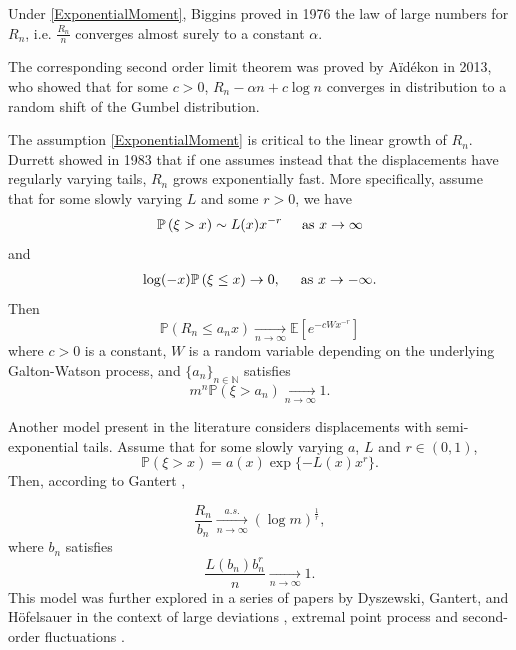 \documentclass[12pt]{article}
\numberwithin{equation}{section}
\newcommand{\E}{\mathbb{E}}
\newcommand{\N}{\mathbb{N}}
\begin{document}
Under \eqref{ExponentialMoment}, Biggins \cite{Biggins1976} proved in 1976 the law of large numbers for $R_n$,  i.e.  $\frac {R_n} n$ converges almost surely to a constant $\alpha$.

The corresponding second order limit theorem was proved by Aïdékon \cite{Aidekon2013} in 2013, who showed that for some $c>0$, $R_n - \alpha  n + c \log n $ converges in distribution to a random shift of the Gumbel distribution.

The assumption \eqref{ExponentialMoment} is critical to the linear growth of $R_n$. Durrett \cite{Durrett1983} showed in 1983 that if one assumes instead that the displacements have regularly varying tails, $R_n$ grows exponentially fast. More specifically, assume that for some slowly varying $L$ and some $r>0$, we have
\begin{align}\label{tailsdurrett}
    \mathbb{P}\left(\xi > x\right) \sim L(x) x^{-r} \hspace{0.5cm} \text{as }x \rightarrow \infty
\end{align}
and
\begin{align}\label{tailsdurrett2}
     \log(-x)\mathbb{P}\left(\xi \leq x\right)\rightarrow 0 , \hspace{0.5cm}  \text{as }x \rightarrow -\infty.
\end{align}
Then
\[
\mathbb{P} ( R_n \leq a_n x)  \xrightarrow[ n \rightarrow \infty]{} \E[e^{-c Wx^{-r}}]
\]
where $c>0$ is a constant, $W$ is a random variable depending on the underlying Galton-Watson process, and $\{a_n\}_{n \in \N}$ satisfies 
\begin{equation}\label{an}
    m^n \mathbb{P}\left(\xi > a_n\right) \xrightarrow[ n \rightarrow \infty]{} 1.
\end{equation}



Another model present in the literature considers displacements with semi-exponential tails. Assume that for some slowly varying $a$, $L$ and $r \in (0,1)$, 
\begin{equation*}
    \mathbb{P}\left(\xi > x\right) = a(x) \exp\{-L(x)x^{r}\}.
\end{equation*}
Then, according to Gantert \cite{Gantert2000}, 

\begin{equation*}
 \frac {R_n} {b_n} \xrightarrow[ n \rightarrow \infty]{a.s.} (\log m)^{\frac 1 r},   
\end{equation*}
where $b_n$ satisfies
\begin{equation}\label{eq:gantert}
\frac {L(b_n)b_n^{r}} n \xrightarrow[ n \rightarrow \infty]{} 1.
\end{equation}
This model was further explored in a series of papers by Dyszewski, Gantert, and Höfelsauer in the context of large deviations \cite{Dyszewski2020}, extremal point process \cite{Dyszewski2022} and second-order fluctuations \cite{Dyszewski2023}. 
\end{document}
